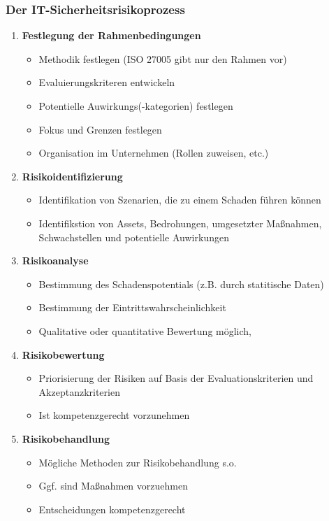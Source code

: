\subsubsection{Der IT-Sicherheitsrisikoprozess}
\begin{enumerate}
	\item \textbf{Festlegung der Rahmenbedingungen}
	\begin{itemize}
		\item Methodik festlegen (ISO 27005 gibt nur den Rahmen vor)
		\item Evaluierungskriteren entwickeln
		\item Potentielle Auwirkungs(-kategorien) festlegen
		\item Fokus und Grenzen festlegen
		\item Organisation im Unternehmen (Rollen zuweisen, etc.)
	\end{itemize}
	\item \textbf{Risikoidentifizierung}
	\begin{itemize}
		\item Identifikation von Szenarien, die zu einem Schaden führen können
		\item Identifikstion von Assets, Bedrohungen, umgesetzter Maßnahmen, Schwachstellen und potentielle Auwirkungen
	\end{itemize}
	\item \textbf{Risikoanalyse}
	\begin{itemize}
		\item Bestimmung des Schadenspotentials (z.B. durch statitische Daten)
		\item Bestimmung der Eintrittswahrscheinlichkeit
		\item Qualitative oder quantitative Bewertung möglich,
	\end{itemize}
	\item \textbf{Risikobewertung}
	\begin{itemize}
		\item Priorisierung der Risiken auf Basis der Evaluationskriterien und Akzeptanzkriterien
		\item Ist kompetenzgerecht vorzunehmen
	\end{itemize}
	\item \textbf{Risikobehandlung}
	\begin{itemize}
		\item Mögliche Methoden zur Risikobehandlung s.o.
		\item Ggf. sind Maßnahmen vorzuehmen
		\item Entscheidungen kompetenzgerecht
	\end{itemize}
\end{enumerate}

